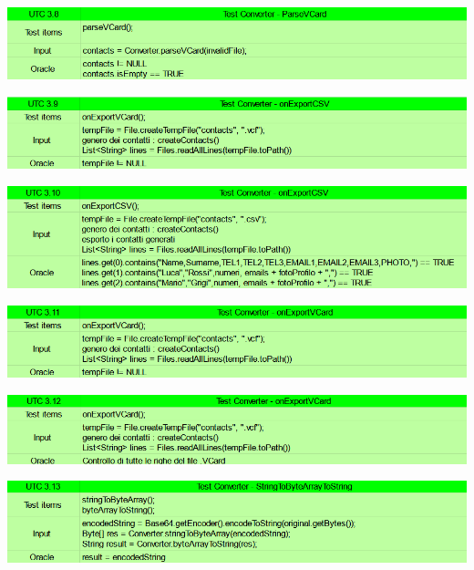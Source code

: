 \begin{center} \includegraphics[width=\linewidth]{images/UTC/3-8.png} \end{center}
\begin{center} \includegraphics[width=\linewidth]{images/UTC/3-9.png} \end{center}
\begin{center} \includegraphics[width=\linewidth]{images/UTC/3-10.png} \end{center}
\begin{center} \includegraphics[width=\linewidth]{images/UTC/3-11.png} \end{center}
\begin{center} \includegraphics[width=\linewidth]{images/UTC/3-12.png} \end{center}
\begin{center} \includegraphics[width=\linewidth]{images/UTC/3-13.png} \end{center}
